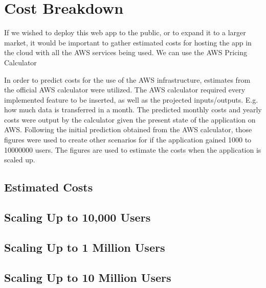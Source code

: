 \chapter{Cost Breakdown}\label{ch:cost-breakdown}

If we wished to deploy this web app to the public, or to expand it to a larger market, it would be important to
gather estimated costs for hosting the app in the cloud with all the AWS services being used.
We can use the AWS Pricing Calculator

In order to predict costs for the use of the AWS infrastructure, estimates from the official AWS
calculator were utilized. The AWS calculator required every implemented feature to be
inserted, as well as the projected inputs/outputs. E.g. how much data is transferred in a month.
The predicted monthly costs and yearly costs were output by the calculator given the present
state of the application on AWS. Following the initial prediction obtained from the AWS
calculator, those figures were used to create other scenarios for if the application gained 1000
to 10000000 users. The figures are used to estimate the costs when the application is scaled
up.


\section{Estimated Costs}\label{sec:estimated-costs}


\section{Scaling Up to 10,000 Users}\label{sec:scaling-up-to-10000-users}


\section{Scaling Up to 1 Million Users}\label{sec:scaling-up-to-1-million-users}


\section{Scaling Up to 10 Million Users}\label{sec:scaling-up-to-10-million-users}
